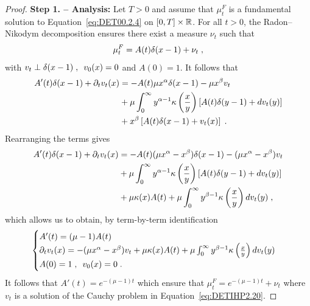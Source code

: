 \documentclass[11pt]{amsart}
\newcommand{\f}{\frac}
\begin{document}
\begin{proof}
\textbf{Step 1. -- Analysis:} Let $T > 0$ and assume that $\mu_t^F$ is a fundamental solution to Equation~\eqref{eq:DET00.2.4} on $[0,T]\times \mathbb{R}$. For all $t> 0$, the Radon--Nikodym decomposition ensures there exist a measure $\nu_t$ such that
    \begin{align*}
        \mu_t^F = A(t) \delta(x-1) + \nu_t \; ,
    \end{align*}
with $v_t \perp \delta(x-1) \; , \enspace v_0(x) = 0$ and $A(0) = 1$. 
It follows that 
\begin{align*}
    A'(t) \delta(x-1) + \partial_t v_t(x)
    &= 
    - A(t) \mu x^{\alpha} \delta(x-1) 
    - \mu x^\beta v_t \\
    &+ \mu \int_0^\infty y^{\alpha -1} \kappa \left( \f{x}{y}\right)\left[ A(t) \delta(y-1) + dv_t(y) \right] \\
    &+ x^\beta \left[ A(t) \delta(x-1) + v_t(x)\right]
    \eqfinp
\end{align*}
Rearranging the terms gives 
\begin{align*}
    A'(t) \delta(x-1) + \partial_t v_t(x)
    &= 
    - A(t) (\mu x^{\alpha} - x^\beta) \delta(x-1) 
    - (\mu x^{\alpha} - x^\beta) v_t \\
    &+ \mu \int_0^\infty y^{\alpha -1} \kappa \left( \f{x}{y}\right)\left[ A(t) \delta(y-1) + dv_t(y) \right] \\
    &+ \mu\kappa(x) A(t)  + \mu \int_0^\infty y^{\beta-1} \kappa \left( \f{x}{y} \right) dv_t(y)
    \eqfinv
\end{align*}
which allows us to obtain, by term-by-term identification
\begin{align}
\begin{cases}
    A'(t) =  (\mu - 1) A(t)\\
    \partial_t v_t(x) = - (\mu x^{\alpha} - x^\beta) v_t + \mu\kappa(x) A(t)  + \mu \int_0^\infty y^{\beta-1} \kappa \left( \f{x}{y} \right) dv_t(y) \\
    A(0) = 1 \eqsepv v_0(x) = 0 \eqfinp
    \label{eq:DETIHP2.20}
\end{cases} 
\end{align}
It follows that $A'(t) = e^{-(\mu-1)t}$ which ensure that $\mu_t^F = e^{-(\mu-1)t} + \nu_t$ where $v_t$ is a solution of the Cauchy problem in Equation~\eqref{eq:DETIHP2.20}.     


\end{proof}
\end{document}
